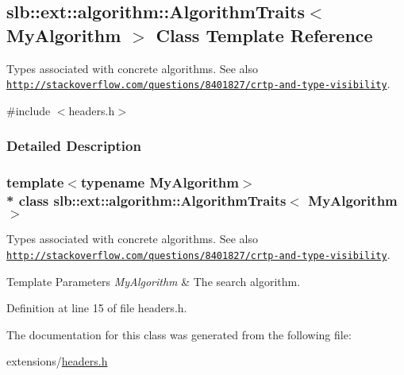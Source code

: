\hypertarget{structslb_1_1ext_1_1algorithm_1_1AlgorithmTraits}{}\subsection{slb\+:\+:ext\+:\+:algorithm\+:\+:Algorithm\+Traits$<$ My\+Algorithm $>$ Class Template Reference}
\label{structslb_1_1ext_1_1algorithm_1_1AlgorithmTraits}


Types associated with concrete algorithms. See also \href{http://stackoverflow.com/questions/8401827/crtp-and-type-visibility}{\tt http\+://stackoverflow.\+com/questions/8401827/crtp-\/and-\/type-\/visibility}.  




{\ttfamily \#include $<$headers.\+h$>$}



\subsubsection{Detailed Description}
\subsubsection*{template$<$typename My\+Algorithm$>$\\*
class slb\+::ext\+::algorithm\+::\+Algorithm\+Traits$<$ My\+Algorithm $>$}

Types associated with concrete algorithms. See also \href{http://stackoverflow.com/questions/8401827/crtp-and-type-visibility}{\tt http\+://stackoverflow.\+com/questions/8401827/crtp-\/and-\/type-\/visibility}. 


\begin{DoxyTemplParams}{Template Parameters}
{\em My\+Algorithm} & The search algorithm. \\
\hline
\end{DoxyTemplParams}


Definition at line 15 of file headers.\+h.



The documentation for this class was generated from the following file\+:\begin{DoxyCompactItemize}
\item 
extensions/\hyperlink{extensions_2headers_8h}{headers.\+h}\end{DoxyCompactItemize}
